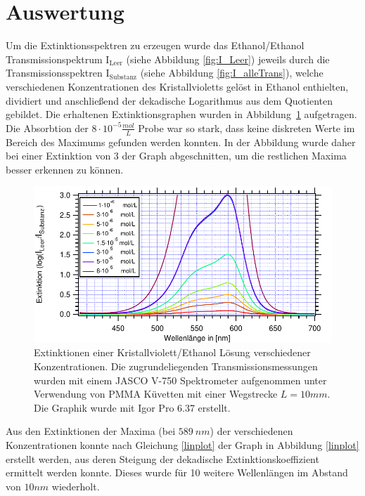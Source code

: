\section{Auswertung}

Um die Extinktionsspektren zu erzeugen wurde das Ethanol/Ethanol Transmissionspektrum $\text{I}_{\text{Leer}}$ (siehe Abbildung \ref{fig:I_Leer}) jeweils durch die Transmissionsspektren $\text{I}_{\text{Substanz}}$ (siehe Abbildung \ref{fig:I_alleTrans}), welche verschiedenen Konzentrationen des Kristallvioletts gelöst in Ethanol enthielten, dividiert und anschließend der dekadische Logarithmus aus dem Quotienten gebildet. Die erhaltenen Extinktionsgraphen wurden in Abbildung~\ref{fig:Extinktionalle} aufgetragen. Die Absorbtion der $8 \cdot 10^{-5} \frac{mol}{L}$ Probe war so stark, dass keine diskreten Werte im Bereich des Maximums gefunden werden konnten. In der Abbildung wurde daher bei einer Extinktion von 3 der Graph abgeschnitten, um die restlichen Maxima besser erkennen zu können.


\begin{figure}[H]
	\centering	
	\begin{minipage}{1\textwidth}
	\includegraphics[width=\columnwidth]{Rohdaten/alleExtinktionenzusammen.pdf}	
	\caption{Extinktionen einer Kristallviolett/Ethanol Lösung verschiedener Konzentrationen. Die zugrundeliegenden Transmissionsmessungen wurden mit einem JASCO V-750 Spektrometer aufgenommen unter Verwendung von PMMA Küvetten mit einer Wegstrecke $L=10 \si{mm}$. Die Graphik wurde mit Igor Pro 6.37 erstellt.}
	\label{fig:Extinktionalle}
	\end{minipage}
	
\end{figure}
	


Aus den Extinktionen der Maxima (bei $589~\si{nm}$) der verschiedenen Konzentrationen konnte nach Gleichung \ref{linplot} der Graph in Abbildung \ref{linplot} erstellt werden, aus deren Steigung der dekadische Extinktionskoeffizient ermittelt werden konnte. Dieses wurde für 10 weitere Wellenlängen im Abstand von $10 \si{nm}$ wiederholt.